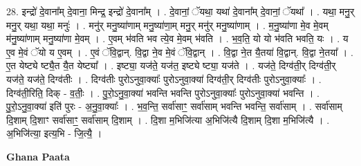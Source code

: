 \documentclass[17pt]{extarticle}
\begin{document}
28. इन्द्रो॑ दे॒वाना᳚म् दे॒वाना॒ मिन्द्र॒ इन्द्रो॑ दे॒वाना᳚म् । . दे॒वानां॒ ॅयथा॒ यथा॑ दे॒वाना᳚म् दे॒वानां॒ ॅयथा᳚ । . यथा॒ मनु॒र् मनु॒र् यथा॒ यथा॒ मनुः॑ । . मनु॑र् मनु॒ष्या॑णाम् मनु॒ष्या॑णा॒म् मनु॒र् मनु॑र् मनु॒ष्या॑णाम् । . म॒नु॒ष्या॑णा मे॒व मे॒वम् म॑नु॒ष्या॑णाम् मनु॒ष्या॑णा मे॒वम् । . ए॒वम् भ॑वति भव त्ये॒व मे॒वम् भ॑वति । . भ॒व॒ति॒ यो यो भ॑वति भवति॒ यः । . य ए॒व मे॒वं ॅयो य ए॒वम् । . ए॒वं ॅवि॒द्वान्. वि॒द्वा ने॒व मे॒वं ॅवि॒द्वान् । . वि॒द्वा ने॒त यै॒तया॑ वि॒द्वान्. वि॒द्वा ने॒तया᳚ । . ए॒त येष्ट्ये ष्ट्यै॒त यै॒त येष्ट्या᳚ । . इष्ट्या॒ यज॑ते॒ यज॑त॒ इष्ट्ये ष्ट्या॒ यज॑ते । . यज॑ते॒ दिग्व॑ती॒र् दिग्व॑ती॒र् यज॑ते॒ यज॑ते॒ दिग्व॑तीः । . दिग्व॑तीः पुरोऽनुवा॒क्याः᳚ पुरोऽनुवा॒क्या॑ दिग्व॑ती॒र् दिग्व॑तीः पुरोऽनुवा॒क्याः᳚ । . दिग्व॑ती॒रिति॒ दिक् - व॒तीः॒ । . पु॒रो॒ऽनु॒वा॒क्या॑ भवन्ति भवन्ति पुरोऽनुवा॒क्याः᳚ पुरोऽनुवा॒क्या॑ भवन्ति । . पु॒रो॒ऽनु॒वा॒क्या॑ इति॑ पुरः - अ॒नु॒वा॒क्याः᳚ । . भ॒व॒न्ति॒ सर्वा॑साꣳ॒॒ सर्वा॑साम् भवन्ति भवन्ति॒ सर्वा॑साम् । . सर्वा॑साम् दि॒शाम् दि॒शाꣳ सर्वा॑साꣳ॒॒ सर्वा॑साम् दि॒शाम् । . दि॒शा म॒भिजि॑त्या अ॒भिजि॑त्यै दि॒शाम् दि॒शा म॒भिजि॑त्यै । . अ॒भिजि॑त्या॒ इत्य॒भि - जि॒त्यै॒ । \newline

\textbf{Ghana Paata } \newline
\end{document}
